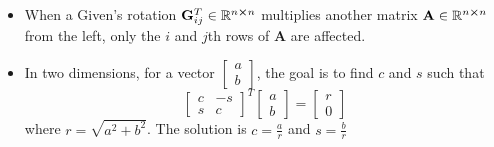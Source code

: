 \documentclass[11pt, a4paper]{article}
\newcommand{\R}{\mathbb{R}} %
\newcommand{\mat}[1]{\mathbf{#1}} %
\begin{document}
\begin{itemize}
	\item When a Given's rotation $ \mat{G}^{T}_{ij} \in \R^{n \cross n}$ multiplies another matrix $ \mat{A}\in \R^{n \cross n} $ from the left, only the $ i $ and $ j $th rows of $ \mat{A} $ are affected.
	
	\item In two dimensions, for a vector $ \begin{bmatrix} a \\ b \end{bmatrix} $, the goal is to find $ c $ and $ s $ such that
	\begin{equation*}
		\begin{bmatrix}
			c & -s\\
			s & c
		\end{bmatrix}^{T}
		\begin{bmatrix} a \\ b \end{bmatrix} = 
		\begin{bmatrix} r \\ 0 \end{bmatrix}
	\end{equation*}
	where $ r = \sqrt{a^{2} + b^{2}} $. The solution is $ c = \frac{a}{r} $ and $ s = \frac{b}{r} $
	

\end{itemize}
\end{document}
